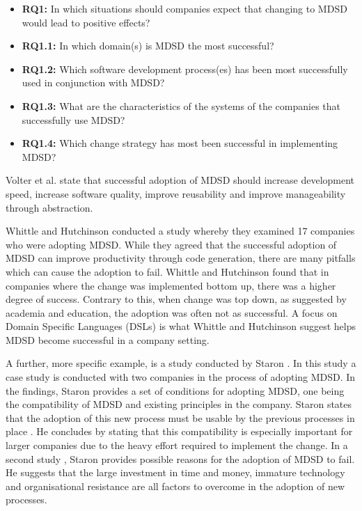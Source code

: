 \documentclass[10pt,twocolumn]{article}
\begin{document}
\begin{itemize}
\item \textbf{RQ1:} In which situations should companies expect that changing to MDSD would lead to positive effects? 
\item \textbf{RQ1.1:} In which domain(s) is MDSD the most successful? 
\item \textbf{RQ1.2:} Which software development process(es) has been most successfully used in conjunction with MDSD?
\item \textbf{RQ1.3:} What are the characteristics of the systems of the companies that successfully use MDSD?
\item \textbf{RQ1.4:} Which change strategy has most been successful in implementing MDSD? 
\end{itemize}


Volter et al. \cite{volter2013model} state that successful adoption of MDSD should increase development speed, increase software quality, improve reusability and improve manageability through abstraction.

Whittle and Hutchinson \cite{whittle2012mismatches} conducted a study whereby they examined 17 companies who were adopting MDSD. While they agreed that the successful adoption of MDSD can improve productivity through code generation, there are many pitfalls which can cause the adoption to fail. Whittle and Hutchinson found that in companies where the change was implemented bottom up, there was a higher degree of success. Contrary to this, when change was top down, as suggested by academia and education, the adoption was often not as successful. A focus on Domain Specific Languages (DSLs) is what Whittle and Hutchinson suggest helps MDSD become successful in a company setting.

A further, more specific example, is a study conducted by Staron \cite{staron2006adopting}. In this study a case study is conducted with two companies in the process of adopting MDSD. In the findings, Staron provides a set of conditions for adopting MDSD, one being the compatibility of MDSD and existing principles in the company. Staron states that the adoption of this new process must be usable by the previous processes in place \cite{staron2006adopting}. He concludes by stating that this compatibility is especially important for larger companies due to the heavy effort required to implement the change. In a second study \cite{staron2008transitioning}, Staron provides possible reasons for the adoption of MDSD to fail. He suggests that the large investment in time and money, immature technology and organisational resistance are all factors to overcome in the adoption of new processes.
\end{document}
